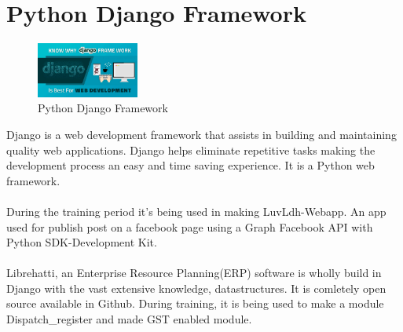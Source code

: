 
\section{Python Django Framework}
\begin{figure}[!h]
\centering
\includegraphics[width=0.3\textwidth]{input/images/django.png}
\caption{Python Django Framework}
\hspace{-1.5em}
\end{figure}
Django is a web development framework that assists in building and maintaining quality web applications. Django helps eliminate repetitive tasks making the development process an easy and time saving experience. It is a Python web framework.\\\\
During the training period it's being used in making LuvLdh-Webapp. An app used for publish post on a facebook page using a Graph Facebook API with Python SDK-Development Kit.\\\\
Librehatti, an Enterprise Resource Planning(ERP) software is wholly build in Django with the vast extensive knowledge, datastructures. It is comletely open source available in Github. During training, it is being used to make a module Dispatch\_register and made GST enabled module.

